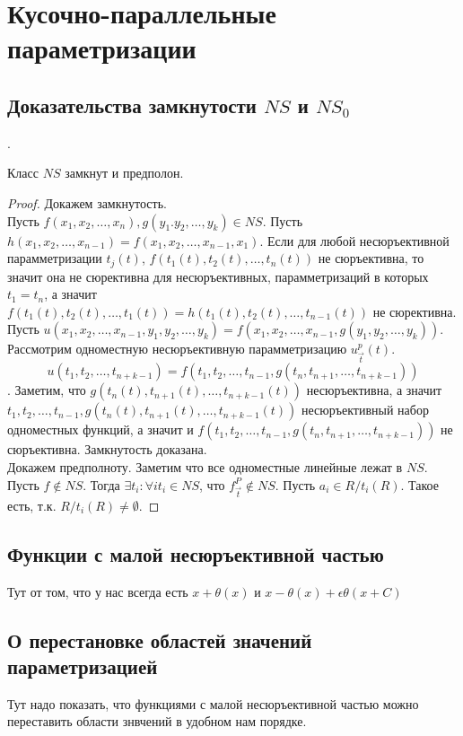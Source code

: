 \documentclass[main.tex]{subfiles}
\begin{document}
\section{Кусочно-параллельные параметризации}
\subsection{Доказательства замкнутости $NS$ и $NS_0$}.
\begin{lemma}
    Класс $NS$ замкнут и предполон.
\end{lemma}
\begin{proof}
    Докажем замкнутость. \\
    Пусть $f(x_1, x_2, \ldots, x_n), g(y_1. y_2, \ldots, y_k) \in NS$. 
    Пусть $h(x_1, x_2, \ldots, x_{n-1}) = f(x_1, x_2, \ldots, x_{n-1}, x_1)$. Если для любой несюръективной парамметризации $t_j(t)$,
    $f(t_1(t), t_2(t), \ldots, t_n(t))$ не сюръективна, то значит она не сюрективна для несюръективных, парамметризаций в которых $t_1 = t_n$,
    а значит $f(t_1(t), t_2(t), \ldots, t_1(t)) = h(t_1(t), t_2(t), \ldots, t_{n-1}(t))$ не сюрективна.\\
    Пусть $u(x_1, x_2, \ldots, x_{n-1}, y_1, y_2, \ldots, y_k) = f(x_1, x_2, \ldots, x_{n-1}, g(y_1, y_2, \ldots, y_k))$. Рассмотрим одноместную несюръективную парамметризацию $u^p_{\vec{t}}(t)$.
    $$u(t_1, t_2, \ldots, t_{n+k-1}) = f(t_1, t_2, \ldots, t_{n-1}, g(t_n, t_{n+1}, \ldots, t_{n+k-1}))$$.
    Заметим, что $g(t_n(t), t_{n+1}(t), \ldots, t_{n+k-1}(t))$ несюръективна, а значит $t_1, t_2, \ldots, t_{n-1}, g(t_n(t), t_{n+1}(t), \ldots, t_{n+k-1}(t))$ несюръективный набор одноместных функций,
    а значит и $f(t_1, t_2, \ldots, t_{n-1}, g(t_n, t_{n+1}, \ldots, t_{n+k-1}))$ не сюръективна. Замкнутость доказана.\\
    Докажем предполноту. Заметим что все одноместные линейные лежат в $NS$. Пусть $f \not\in NS$. Тогда $\exists t_i:\forall i t_i \in NS$, что $f^P_{\vec{t}} \not \in NS$. Пусть $a_i \in R / t_i(R)$. Такое есть, т.к. $R / t_i(R) \neq \emptyset$. 

\end{proof}

\subsection{Функции с малой несюръективной частью}
Тут от том, что у нас всегда есть $x + \theta(x)$ и $x-\theta(x) + \epsilon \theta(x+C)$

\subsection{О перестановке областей значений параметризацией}
Тут надо показать, что функциями с малой несюръективной частью можно переставить области знвчений в удобном нам порядке.
  
\end{document}
